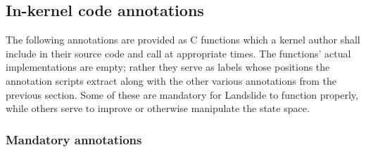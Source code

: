 
\subsection{In-kernel code annotations}
\label{sec:tell-landslide}

The following annotations are provided as C functions
which a kernel author shall include in their source code and call at appropriate times.
The functions' actual implementations are empty;
rather they serve as labels whose positions the annotation scripts extract
along with the other various annotations from the previous section.
Some of these are mandatory for Landslide to function properly,
while others serve to improve or otherwise manipulate the state space.

\subsubsection{Mandatory annotations}

